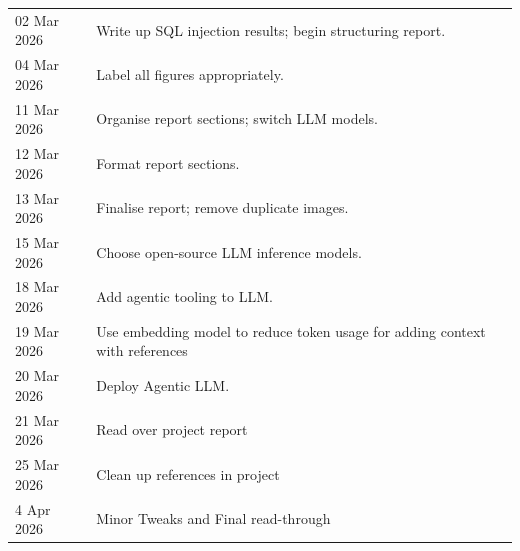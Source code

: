 \documentclass[12pt, a4paper]{report}   %
\begin{document}
\begin{longtable}{p{3cm} p{11cm}}
  02 Mar 2026  & Write up SQL injection results; begin structuring report. \\
  04 Mar 2026  & Label all figures appropriately. \\
  11 Mar 2026  & Organise report sections; switch LLM models. \\
  12 Mar 2026  & Format report sections. \\
  13 Mar 2026  & Finalise report; remove duplicate images. \\
  15 Mar 2026  & Choose open-source LLM inference models. \\
  18 Mar 2026  & Add agentic tooling to LLM. \\
  19 Mar 2026  & Use embedding model to reduce token usage for adding context with references \\
  20 Mar 2026  & Deploy Agentic LLM. \\
  21 Mar 2026  & Read over project report \\
  25 Mar 2026  & Clean up references in project \\
  4 Apr 2026  & Minor Tweaks and Final
  read-through\\
  \bottomrule
\end{longtable}
\end{document}
